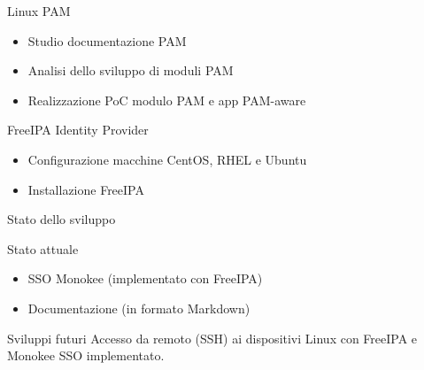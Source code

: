 \documentclass{beamer}
\begin{document}
	\begin{frame}{Linux PAM}
				
		\begin{itemize}
			\item Studio documentazione PAM \vspace{.5em}
			\item Analisi dello sviluppo di moduli PAM \vspace{.5em}
			\item Realizzazione PoC modulo PAM e app PAM-aware \vspace{.5em}
		\end{itemize}
		
	\end{frame}
	
	\begin{frame}{FreeIPA Identity Provider}
				
		\begin{itemize}
			\item Configurazione macchine CentOS, RHEL e Ubuntu \vspace{.5em}
			\item Installazione FreeIPA \vspace{.5em}
		\end{itemize}
		
	\end{frame}
	
	\begin{frame}{Stato dello sviluppo}
				
		\begin{exampleblock}{Stato attuale}
			\begin{itemize}
				\item SSO Monokee (implementato con FreeIPA) \vspace{.5em}
				\item Documentazione (in formato Markdown) \vspace{.5em}
			\end{itemize}
		\end{exampleblock}
		
		\begin{block}{Sviluppi futuri}
			Accesso da remoto (SSH) ai dispositivi Linux con FreeIPA e Monokee SSO implementato.
		\end{block}
	
	\end{frame}
	
	
\end{document}

